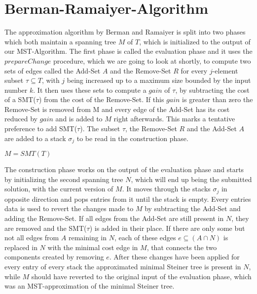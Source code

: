 \section{Berman-Ramaiyer-Algorithm}

The approximation algorithm by Berman and Ramaiyer is split into two phases which both maintain a spanning tree $M$ of $T$, which is initialized to the output of our MST-Algorithm. The first phase is called the evaluation phase and it uses the $prepareChange$ procedure, which we are going to look at shortly, to compute two sets of edges called the Add-Set $A$ and the Remove-Set $R$ for every $j$-element subset $\tau \subseteq T$, with $j$ being increased up to a maximum size bounded by the input number $k$. It then uses these sets to compute a $gain$ of $\tau$, by subtracting the cost of a SMT($\tau$) from the cost of the Remove-Set. If this $gain$ is greater than zero the Remove-Set is removed from M and every edge of the Add-Set has its cost reduced by $gain$ and is added to $M$ right afterwards. This marks a tentative preference to add SMT($\tau$). The subset $\tau$, the Remove-Set $R$ and the Add-Set $A$ are added to a stack $\sigma_j$ to be read in the construction phase.

\begin{algorithm}[ht]
$M = SMT(T)$\;
\label{fig:evaluationPseudo}
\end{algorithm}

The construction phase works on the output of the evaluation phase and starts by initializing the second spanning tree $N$, which will end up being the submitted solution, with the current version of $M$. It moves through the stacks $\sigma_j$ in opposite direction and pops entries from it until the stack is empty. Every entries data is used to revert the changes made to $M$ by subtracting the Add-Set and adding the Remove-Set. If all edges from the Add-Set are still present in $N$, they are removed and the SMT($\tau$) is added in their place. If there are only some but not all edges from $A$ remaining in $N$, each of these edges $e \subseteq (A\cap N)$ is replaced in $N$ with the minimal cost edge in $M$, that connects the two components created by removing $e$. After these changes have been applied for every entry of every stack the approximated minimal Steiner tree is present in $N$, while $M$ should have reverted to the original input of the evaluation phase, which was an MST-approximation of the minimal Steiner tree. 

